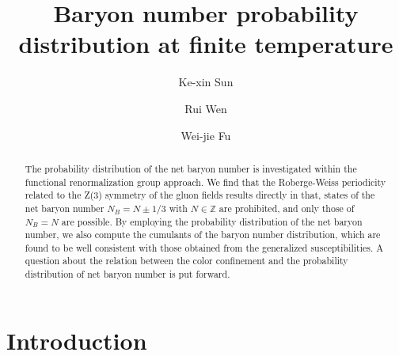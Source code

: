 \documentclass[%
reprint,
superscriptaddress,
showpacs,preprintnumbers,
 amsmath,amssymb,
 aps,
prd,
]{revtex4-1}
\begin{document}
\preprint{}

\title{Baryon number probability distribution at finite temperature
}

\author{Ke-xin Sun}

\author{Rui Wen}

\author{Wei-jie Fu}


\begin{abstract}

The probability distribution of the net baryon number is investigated within the functional renormalization group approach. We find that the Roberge-Weiss periodicity related to the Z(3) symmetry of the gluon fields results directly in that, states of the net baryon number $N_B=N\pm 1/3$ with $N\in\mathbb{Z}$ are prohibited, and only those of $N_B=N$ are possible. By employing the probability distribution of the net baryon number, we also compute the cumulants of the baryon number distribution, which are found to be well consistent with those obtained from the generalized susceptibilities. A question about the relation between the color confinement and the probability distribution of net baryon number is put forward.

\end{abstract}

\maketitle


\section{Introduction}
\label{sec:intro}
\end{document}
